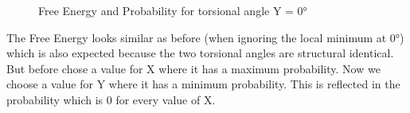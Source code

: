 \documentclass[a4paper,11pt]{scrartcl}
\begin{document}
\begin{figure} [htb]
	\caption{Free Energy and Probability for torsional angle Y = 0°}
	\label{fig:umbrella2d_y0}
\end{figure}

The Free Energy looks similar as before (when ignoring the local minimum at 0°) which is also expected because the two torsional angles are structural identical. But before chose a value for X where it has a maximum probability. Now we choose a value for Y where it has a minimum probability. This is reflected in the probability which is 0 for every value of X. 
\\
\end{document}
